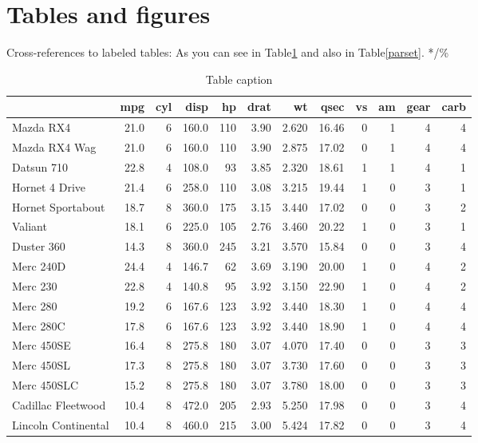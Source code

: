 \documentclass[aoas]{imsart}
\numberwithin{equation}{section}
\theoremstyle{plain}
\theoremstyle{remark}
\begin{document}
\hypertarget{tables-and-figures}{%
\section{Tables and figures}\label{tables-and-figures}}

Cross-references to labeled tables: As you can see in Table\ref{tab:mtc}
and also in Table\ref{parset}. */\%

\begin{table}

\caption{\label{tab:mtc}Table caption}
\centering
\begin{tabular}[t]{lrrrrrrrrrrr}
\hline
  & mpg & cyl & disp & hp & drat & wt & qsec & vs & am & gear & carb\\
\hline
Mazda RX4 & 21.0 & 6 & 160.0 & 110 & 3.90 & 2.620 & 16.46 & 0 & 1 & 4 & 4\\
Mazda RX4 Wag & 21.0 & 6 & 160.0 & 110 & 3.90 & 2.875 & 17.02 & 0 & 1 & 4 & 4\\
Datsun 710 & 22.8 & 4 & 108.0 & 93 & 3.85 & 2.320 & 18.61 & 1 & 1 & 4 & 1\\
Hornet 4 Drive & 21.4 & 6 & 258.0 & 110 & 3.08 & 3.215 & 19.44 & 1 & 0 & 3 & 1\\
Hornet Sportabout & 18.7 & 8 & 360.0 & 175 & 3.15 & 3.440 & 17.02 & 0 & 0 & 3 & 2\\
Valiant & 18.1 & 6 & 225.0 & 105 & 2.76 & 3.460 & 20.22 & 1 & 0 & 3 & 1\\
Duster 360 & 14.3 & 8 & 360.0 & 245 & 3.21 & 3.570 & 15.84 & 0 & 0 & 3 & 4\\
Merc 240D & 24.4 & 4 & 146.7 & 62 & 3.69 & 3.190 & 20.00 & 1 & 0 & 4 & 2\\
Merc 230 & 22.8 & 4 & 140.8 & 95 & 3.92 & 3.150 & 22.90 & 1 & 0 & 4 & 2\\
Merc 280 & 19.2 & 6 & 167.6 & 123 & 3.92 & 3.440 & 18.30 & 1 & 0 & 4 & 4\\
Merc 280C & 17.8 & 6 & 167.6 & 123 & 3.92 & 3.440 & 18.90 & 1 & 0 & 4 & 4\\
Merc 450SE & 16.4 & 8 & 275.8 & 180 & 3.07 & 4.070 & 17.40 & 0 & 0 & 3 & 3\\
Merc 450SL & 17.3 & 8 & 275.8 & 180 & 3.07 & 3.730 & 17.60 & 0 & 0 & 3 & 3\\
Merc 450SLC & 15.2 & 8 & 275.8 & 180 & 3.07 & 3.780 & 18.00 & 0 & 0 & 3 & 3\\
Cadillac Fleetwood & 10.4 & 8 & 472.0 & 205 & 2.93 & 5.250 & 17.98 & 0 & 0 & 3 & 4\\
Lincoln Continental & 10.4 & 8 & 460.0 & 215 & 3.00 & 5.424 & 17.82 & 0 & 0 & 3 & 4\\

\end{tabular}
\end{table}
\end{document}
